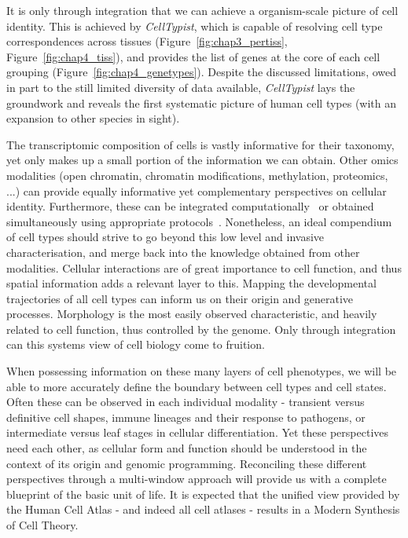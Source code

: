It is only through integration that we can achieve a organism-scale picture of cell identity. This is achieved by \textit{CellTypist}, which is capable of resolving cell type correspondences across tissues (Figure~\ref{fig:chap3_pertiss}, Figure~\ref{fig:chap4_tiss}), and provides the list of genes at the core of each cell grouping (Figure~\ref{fig:chap4_genetypes}). Despite the discussed limitations, owed in part to the still limited diversity of data available, \textit{CellTypist} lays the groundwork and reveals the first systematic picture of human cell types (with an expansion to other species in sight).

The transcriptomic composition of cells is vastly informative for their taxonomy, yet  only makes up a small portion of the information we can obtain. Other omics modalities (open chromatin, chromatin modifications, methylation, proteomics, ...) can provide equally informative yet complementary perspectives on cellular identity. Furthermore, these can be integrated computationally~\citep{stuart_comprehensive_2019} or obtained simultaneously using appropriate protocols~\citep{angermueller_parallel_2016,clark_scnmt-seq_2018}. Nonetheless, an ideal compendium of cell types should strive to go beyond this low level and invasive characterisation, and merge back into the knowledge obtained from other modalities. Cellular interactions are of great importance to cell function, and thus spatial information adds a relevant layer to this. Mapping the developmental trajectories of all cell types can inform us on their origin and generative processes. Morphology is the most easily observed characteristic, and heavily related to cell function, thus controlled by the genome. Only through integration can this systems view of cell biology come to fruition.

When possessing information on these many layers of cell phenotypes, we will be able to more accurately define the boundary between cell types and cell states. Often these can be observed in each individual modality - transient versus definitive cell shapes, immune lineages and their response to pathogens, or intermediate versus leaf stages in cellular differentiation. Yet these perspectives need each other, as cellular form and function should be understood in the context of its origin and genomic programming. Reconciling these different perspectives through a multi-window approach will provide us with a complete blueprint of the basic unit of life. It is expected that the unified view provided by the Human Cell Atlas - and indeed all cell atlases - results in a Modern Synthesis of Cell Theory.

